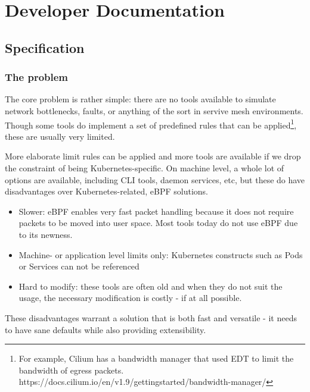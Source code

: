 \chapter{Developer Documentation} %
\label{ch:impl}

\section{Specification}
\subsection{The problem}
The core problem is rather simple: there are no tools available to simulate network bottlenecks, faults, or anything of the sort in servive mesh environments. Though some tools do implement a set of predefined rules that can be applied\footnote{For example, Cilium has a bandwidth manager that used EDT to limit the bandwidth of egress packets. https://docs.cilium.io/en/v1.9/gettingstarted/bandwidth-manager/}, these are usually very limited.

More elaborate limit rules can be applied and more tools are available if we drop the constraint of being Kubernetes-specific. On machine level, a whole lot of options are available, including CLI tools, daemon services, etc, but these do have disadvantages over Kubernetes-related, eBPF solutions.
\begin{itemize}
	\item Slower: eBPF enables very fast packet handling because it does not require packets to be moved into user space. Most tools today do not use eBPF due to its newness. 
	\item Machine- or application level limits only: Kubernetes constructs such as Pods or Services can not be referenced
	\item Hard to modify: these tools are often old and when they do not suit the usage, the necessary modification is costly - if at all possible. \newline
\end{itemize}

These disadvantages warrant a solution that is both fast and versatile - it needs to have sane defaults while also providing extensibility.

